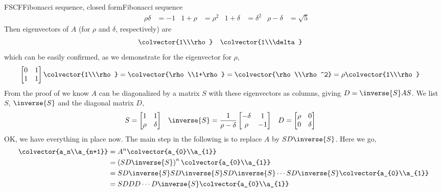 \begin{example}{FSCF}{Fibonacci sequence, closed form}{Fibonacci sequence}
\begin{align*}
&
\rho\delta&=-1
&
1+\rho&=\rho^2
&
1+\delta&=\delta^2
&
\rho-\delta&=\sqrt{5}
\end{align*}
%
Then eigenvectors of $A$ (for $\rho$ and $\delta$, respectively) are
%
\begin{align*}
&\colvector{1\\\rho}
&
&\colvector{1\\\delta}
\end{align*}
%
which can be easily confirmed, as we demonstrate for the eigenvector for $\rho$,
%
\begin{align*}
\begin{bmatrix}0&1\\1&1\end{bmatrix}\colvector{1\\\rho}
&
=\colvector{\rho\\1+\rho}
=\colvector{\rho\\\rho^2}
=\rho\colvector{1\\\rho}
\end{align*}
%
From the proof of  we know $A$ can be diagonalized by a matrix $S$ with these eigenvectors as columns, giving $D=\inverse{S}AS$.  We list $S$, $\inverse{S}$ and the diagonal matrix $D$,
%
\begin{align*}
S&=\begin{bmatrix}1&1\\\rho&\delta\end{bmatrix}
&
\inverse{S}&=\frac{1}{\rho-\delta}\begin{bmatrix}-\delta&1\\\rho&-1\end{bmatrix}
&
D&=\begin{bmatrix}\rho&0\\0&\delta\end{bmatrix}
\end{align*}
%
OK, we have everything in place now.  The main step in the following is to replace $A$ by $SD\inverse{S}$. Here we go,
%
\begin{align*}
\colvector{a_n\\a_{n+1}}
&=A^n\colvector{a_{0}\\a_{1}}\\
&=\left(SD\inverse{S}\right)^n\colvector{a_{0}\\a_{1}}\\
&=SD\inverse{S}SD\inverse{S}SD\inverse{S}\cdots SD\inverse{S}\colvector{a_{0}\\a_{1}}\\
&=SDDD\cdots D\inverse{S}\colvector{a_{0}\\a_{1}}\\

\end{align*}
\end{example}
